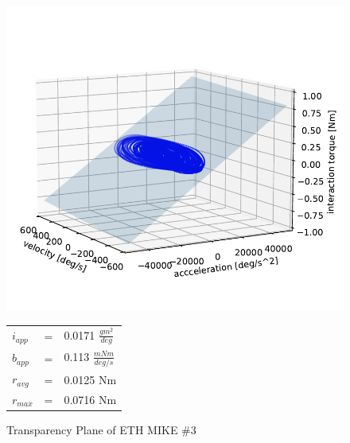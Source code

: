 \begin{figure}[h]
    \begin{minipage}[m]{0.8\textwidth}
     \centering
        \includegraphics[width = \textwidth]{chapters/transparency/Mike3_Transparency.pdf}
    \end{minipage}
    \hfill
\begin{minipage}[m]{0.15\textwidth}
    \centering
    \begin{tabular}{lll}
        $i_{app}$ & = & 0.0171 $\frac{gm^2}{deg}$ \\ 
        $b_{app}$  & = & 0.113 $\frac{mNm}{deg/s}$  \\ 
        $r_{avg}$  & = & 0.0125 Nm \\ 
        $r_{max}$  & = & 0.0716 Nm \\ 
    \end{tabular}
\end{minipage}
\caption{Transparency Plane of ETH MIKE \#3}
\end{figure}